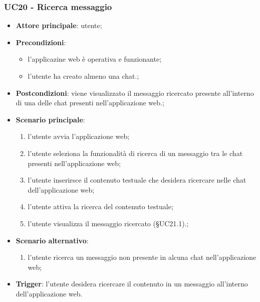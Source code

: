 \documentclass[10pt, a4paper]{article}
\begin{document}
    \subsubsection{UC20 - Ricerca messaggio}
    \begin{itemize}
        \item \textbf{Attore principale}: utente;
        \item \textbf{Precondizioni}:
        \begin{itemize}
            \item l'applicazine web è operativa e funzionante;
            \item l'utente ha creato almeno una chat.;
        \end{itemize}
        \item \textbf{Postcondizioni}: viene visualizzato il messaggio ricercato presente all'interno di una delle chat presenti nell'applicazione web.;
        \item \textbf{Scenario principale}:
            \begin{enumerate}
                \item l'utente avvia l'applicazione web;
                \item l'utente seleziona la funzionalità di ricerca di un messaggio tra le chat presenti nell'applicazione web;
                \item l'utente inserirsce il contenuto testuale che desidera ricercare nelle chat dell'applicazione web;
                \item l'utente attiva la ricerca del contenuto testuale;
                \item l'utente visualizza il messaggio ricercato (\S UC21.1).;
            \end{enumerate}
        \item \textbf{Scenario alternativo}: 
        \begin{enumerate}
            \item l'utente ricerca un messaggio non presente in alcuna chat nell'applicazione web;
        \end{enumerate}
        \item \textbf{Trigger}: l'utente desidera ricercare il contenuto in un messaggio all'interno dell'applicazione web.
    \end{itemize}
\end{document}
